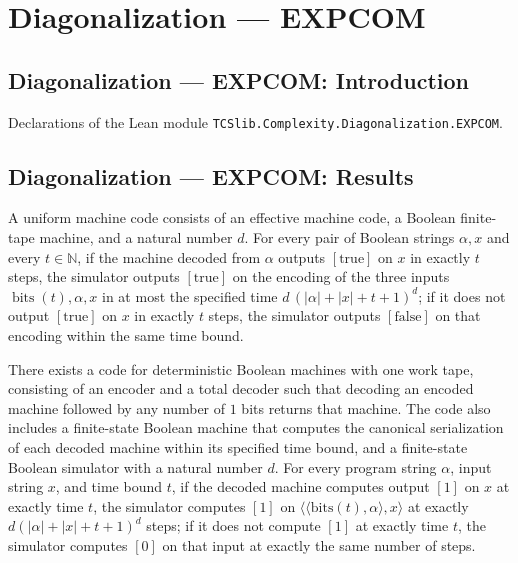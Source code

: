 \section{Diagonalization --- EXPCOM}
\subsection*{Diagonalization --- EXPCOM: Introduction}

Declarations of the Lean module \texttt{TCSlib.Complexity.Diagonalization.EXPCOM}.

\subsection*{Diagonalization --- EXPCOM: Results}

\begin{definition}
\label{Turing.UniformMachineCode}
\leanok
{}
A uniform machine code consists of an effective machine code, a Boolean finite-tape
machine, and a natural number $d$. For every pair of Boolean strings $\alpha,x$ and
every $t\in\mathbb N$, if the machine decoded from $\alpha$ outputs $[\mathrm{true}]$ on
$x$ in exactly $t$ steps, the simulator outputs $[\mathrm{true}]$ on the encoding of the
three inputs $\operatorname{bits}(t),\alpha,x$ in at most the specified time
$d\,(|\alpha|+|x|+t+1)^d$; if it does not output $[\mathrm{true}]$ on $x$ in exactly $t$
steps, the simulator outputs $[\mathrm{false}]$ on that encoding within the same time
bound.
\end{definition}

\begin{theorem}
\label{Turing.exists_uniformMachineCode}
\leanok
{}
There exists a code for deterministic Boolean machines with one work tape, consisting of
an encoder and a total decoder such that decoding an encoded machine followed by any
number of $1$ bits returns that machine. The code also includes a finite-state Boolean
machine that computes the canonical serialization of each decoded machine within its
specified time bound, and a finite-state Boolean simulator with a natural number $d$.
For every program string $\alpha$, input string $x$, and time bound $t$, if the decoded
machine computes output $[1]$ on $x$ at exactly time $t$, the simulator computes $[1]$
on $\langle\langle\mathrm{bits}(t),\alpha\rangle,x\rangle$ at exactly
$d(|\alpha|+|x|+t+1)^d$ steps; if it does not compute $[1]$ at exactly time $t$, the
simulator computes $[0]$ on that input at exactly the same number of steps.
\end{theorem}

